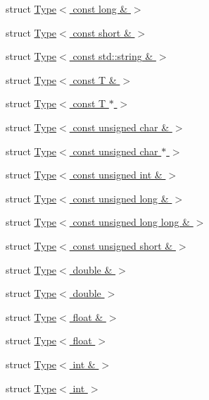 \begin{DoxyCompactItemize}
\item 
struct \hyperlink{structSLB_1_1Private_1_1Type_3_01const_01long_01_6_01_4}{Type$<$ const long \& $>$}
\item 
struct \hyperlink{structSLB_1_1Private_1_1Type_3_01const_01short_01_6_01_4}{Type$<$ const short \& $>$}
\item 
struct \hyperlink{structSLB_1_1Private_1_1Type_3_01const_01std_1_1string_01_6_01_4}{Type$<$ const std\+::string \& $>$}
\item 
struct \hyperlink{structSLB_1_1Private_1_1Type_3_01const_01T_01_6_01_4}{Type$<$ const T \& $>$}
\item 
struct \hyperlink{structSLB_1_1Private_1_1Type_3_01const_01T_01_5_01_4}{Type$<$ const T $\ast$ $>$}
\item 
struct \hyperlink{structSLB_1_1Private_1_1Type_3_01const_01unsigned_01char_01_6_01_4}{Type$<$ const unsigned char \& $>$}
\item 
struct \hyperlink{structSLB_1_1Private_1_1Type_3_01const_01unsigned_01char_01_5_01_4}{Type$<$ const unsigned char $\ast$ $>$}
\item 
struct \hyperlink{structSLB_1_1Private_1_1Type_3_01const_01unsigned_01int_01_6_01_4}{Type$<$ const unsigned int \& $>$}
\item 
struct \hyperlink{structSLB_1_1Private_1_1Type_3_01const_01unsigned_01long_01_6_01_4}{Type$<$ const unsigned long \& $>$}
\item 
struct \hyperlink{structSLB_1_1Private_1_1Type_3_01const_01unsigned_01long_01long_01_6_01_4}{Type$<$ const unsigned long long \& $>$}
\item 
struct \hyperlink{structSLB_1_1Private_1_1Type_3_01const_01unsigned_01short_01_6_01_4}{Type$<$ const unsigned short \& $>$}
\item 
struct \hyperlink{structSLB_1_1Private_1_1Type_3_01double_01_6_01_4}{Type$<$ double \& $>$}
\item 
struct \hyperlink{structSLB_1_1Private_1_1Type_3_01double_01_4}{Type$<$ double $>$}
\item 
struct \hyperlink{structSLB_1_1Private_1_1Type_3_01float_01_6_01_4}{Type$<$ float \& $>$}
\item 
struct \hyperlink{structSLB_1_1Private_1_1Type_3_01float_01_4}{Type$<$ float $>$}
\item 
struct \hyperlink{structSLB_1_1Private_1_1Type_3_01int_01_6_01_4}{Type$<$ int \& $>$}
\item 
struct \hyperlink{structSLB_1_1Private_1_1Type_3_01int_01_4}{Type$<$ int $>$}
\item 

\end{DoxyCompactItemize}
